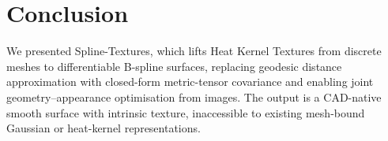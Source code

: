 \documentclass[acmtog, review=true, authorversion=false]{acmart}
\begin{document}
\section{Conclusion}\label{sec:conclusion}
We presented Spline-Textures, which lifts Heat Kernel Textures from
discrete meshes to differentiable B-spline surfaces, replacing geodesic
distance approximation with closed-form metric-tensor covariance and
enabling joint geometry--appearance optimisation from images. The output is
a CAD-native smooth surface with intrinsic texture, inaccessible to existing
mesh-bound Gaussian or heat-kernel representations.



\end{document}
